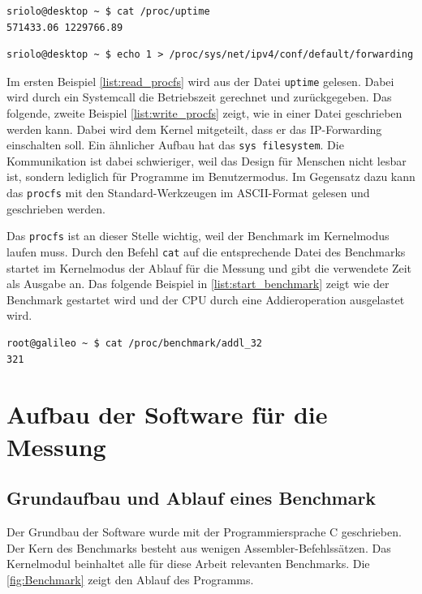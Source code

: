 \lstset{language=bash}
\begin{minipage}{\linewidth}
\begin{lstlisting}[label={list:read_procfs},caption={Lesen im procfs}]
sriolo@desktop ~ $ cat /proc/uptime 
571433.06 1229766.89
\end{lstlisting}
\begin{lstlisting}[label={list:write_procfs},caption={Schreiben im procfs}]
sriolo@desktop ~ $ echo 1 > /proc/sys/net/ipv4/conf/default/forwarding
\end{lstlisting}
\end{minipage}


Im ersten Beispiel \autoref{list:read_procfs} wird aus der Datei \texttt{uptime} gelesen. Dabei wird durch ein Systemcall die Betriebszeit gerechnet und zurückgegeben. Das folgende, zweite Beispiel \autoref{list:write_procfs} zeigt, wie in einer Datei geschrieben werden kann. Dabei wird dem Kernel mitgeteilt, dass er das IP-Forwarding einschalten soll. Ein ähnlicher Aufbau hat das \texttt{sys filesystem}. Die Kommunikation ist dabei schwieriger, weil das Design für Menschen nicht lesbar ist, sondern lediglich für Programme im Benutzermodus. Im Gegensatz dazu kann das \texttt{procfs} mit den Standard-Werkzeugen im ASCII-Format gelesen und geschrieben werden.
\par
Das \texttt{procfs} ist an dieser Stelle wichtig, weil der Benchmark im Kernelmodus laufen muss. Durch den Befehl \texttt{cat} auf die entsprechende Datei des Benchmarks startet im Kernelmodus der Ablauf für die Messung und gibt die verwendete Zeit als Ausgabe an. Das folgende Beispiel in \autoref{list:start_benchmark} zeigt wie der Benchmark gestartet wird und der CPU durch eine Addieroperation ausgelastet wird.

\lstset{language=bash}
\begin{minipage}{\linewidth}
\begin{lstlisting}[label={list:start_benchmark},caption={Starten des Benchmark}]
root@galileo ~ $ cat /proc/benchmark/addl_32
321
\end{lstlisting}
\end{minipage}


\section{Aufbau der Software für die Messung}


\subsection{Grundaufbau und Ablauf eines Benchmark}
Der Grundbau der Software wurde mit der Programmiersprache C geschrieben. Der Kern des Benchmarks besteht aus wenigen Assembler-Befehlssätzen. Das Kernelmodul beinhaltet alle für diese Arbeit relevanten Benchmarks. Die \autoref{fig:Benchmark} zeigt den Ablauf des Programms.

